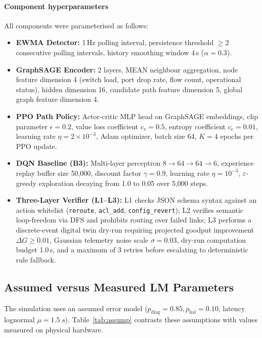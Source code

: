 \documentclass[sn-mathphys,Numbered]{sn-jnl}
\begin{document}
\paragraph{Component hyperparameters} All components were parameterised as follows:
\begin{itemize}
\item \textbf{EWMA Detector:} 1\,Hz polling interval, persistence threshold $\ge 2$ consecutive polling intervals, history smoothing window 4\,s ($\alpha=0.3$).
\item \textbf{GraphSAGE Encoder:} 2 layers, MEAN neighbour aggregation, node feature dimension 4 (switch load, port drop rate, flow count, operational status), hidden dimension 16, candidate path feature dimension 5, global graph feature dimension 4.
\item \textbf{PPO Path Policy:} Actor-critic MLP head on GraphSAGE embeddings, clip parameter $\epsilon=0.2$, value loss coefficient $c_v=0.5$, entropy coefficient $c_e=0.01$, learning rate $\eta=2\times 10^{-3}$, Adam optimizer, batch size 64, $K=4$ epochs per PPO update.
\item \textbf{DQN Baseline (B3):} Multi-layer perceptron $8 \to 64 \to 64 \to 6$, experience replay buffer size 50,000, discount factor $\gamma=0.9$, learning rate $\eta=10^{-3}$, $\varepsilon$-greedy exploration decaying from 1.0 to 0.05 over 5,000 steps.
\item \textbf{Three-Layer Verifier (L1--L3):} L1 checks JSON schema syntax against an action whitelist (\texttt{reroute}, \texttt{acl\_add}, \texttt{config\_revert}); L2 verifies semantic loop-freedom via DFS and prohibits routing over failed links; L3 performs a discrete-event digital twin dry-run requiring projected goodput improvement $\Delta G \ge 0.01$, Gaussian telemetry noise scale $\sigma=0.03$, dry-run computation budget 1.0\,s, and a maximum of 3 retries before escalating to deterministic rule fallback.
\end{itemize}

\subsection{Assumed versus Measured LM Parameters}
The simulation uses an assumed error model ($p_{\text{diag}}=0.85, p_{\text{hal}}=0.10$, latency lognormal $\mu=1.5\text{ s}$). Table~\ref{tab:assump} contrasts these assumptions with values measured on physical hardware.
\end{document}
